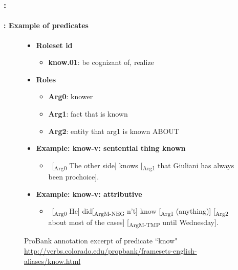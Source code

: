 \documentclass[xcolor=table]{beamer}
\begin{document}
\begin{frame}
	\frametitle{\insertshortsubtitle: \insertsection}
	\framesubtitle{\insertsubsection: Example of predicates}
	

	\begin{figure}
		\scriptsize
		\begin{tcolorbox}[colback=white, colframe=blue, boxrule=1pt, text width=.91\textwidth]
		\begin{itemize}
			\item \textbf{Roleset id}
			\begin{itemize}\scriptsize
				\item \textbf{know.01}: be cognizant of, realize
			\end{itemize}
			\item \textbf{Roles}
			\begin{itemize}\scriptsize
				\item \textbf{Arg0}: knower
				\item \textbf{Arg1}: fact that is known
				\item \textbf{Arg2}: entity that arg1 is known ABOUT
			\end{itemize}
		
			\item \textbf{Example: know-v: sentential thing known}
			\begin{itemize}\scriptsize
				\item \ [\textsubscript{\color{red}Arg0} The other side] knows [\textsubscript{\color{red}Arg1} that Giuliani has always been prochoice].
			\end{itemize}
		
			\item \textbf{Example: know-v: attributive}
			\begin{itemize}\scriptsize
				\item \ [\textsubscript{\color{red}Arg0} He] did[\textsubscript{\color{red}ArgM-NEG} n't] know [\textsubscript{\color{red}Arg1} (anything)] [\textsubscript{\color{red}Arg2} about most of the cases] [\textsubscript{\color{red}ArgM-TMP} until Wednesday].
			\end{itemize}
		\end{itemize}
		\end{tcolorbox}
			
		\caption{ProBank annotation excerpt of predicate ``know" \url{http://verbs.colorado.edu/propbank/framesets-english-aliases/know.html}}
	\end{figure}
	
\end{frame}
\end{document}

